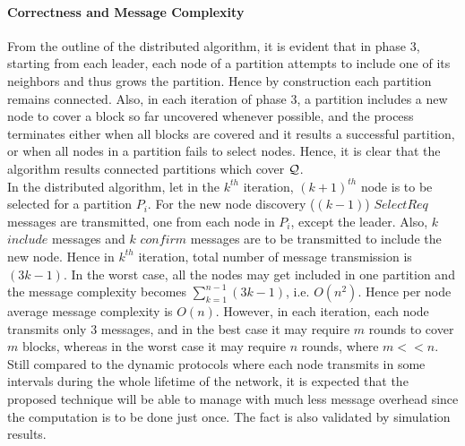 \documentclass{acm_proc_article-sp}
\begin{document}
\paragraph{\bf Correctness and Message Complexity} From the outline of the distributed algorithm, it is evident that in phase 3, starting from each leader, each node of a partition attempts to include one of its neighbors and thus grows the partition. Hence by construction each partition remains connected. Also, in each iteration of phase 3, a partition includes a new node to cover a block so far uncovered whenever possible, and the process terminates either when all blocks are covered and it results a successful partition, or when all nodes in a partition fails to select nodes. Hence, it is clear that the algorithm results connected partitions which cover ${\cal Q}$.\\
In the distributed algorithm, let in the $k^{th}$ iteration, $(k+1)^{th}$ node is to be selected for a partition $P_i$.
For the new node discovery ($(k-1)$) $SelectReq$ messages are transmitted, one from each node in $P_i$, except the leader. Also, $k$ $include$ messages and $k$ $confirm$ messages are to be transmitted to include the new node. Hence in $k^{th}$ iteration, total number of message transmission is $(3k-1)$.
In the worst case, all the nodes may get included in one partition and the message complexity becomes $\displaystyle\sum\limits_{k=1}^{n-1} (3k-1)$, i.e. $ O(n^2)$. Hence per node average message complexity is $O(n)$. However, in each iteration, each node transmits only $3$ messages, and in the best case it may require $m$ rounds to cover $m$ blocks, whereas in the worst case it may require $n$ rounds, where $m << n$. Still compared to the dynamic protocols where each node transmits in some intervals during the whole lifetime of the network, it is expected that the proposed technique will be able to manage with much less message overhead since the computation is to be done just once. The fact is also validated by simulation results.
\end{document}

